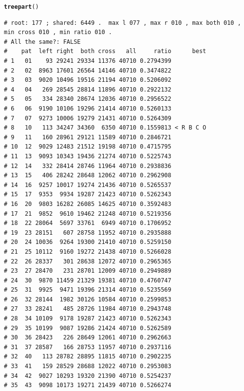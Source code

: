 \documentclass{article}\usepackage[]{graphicx}\usepackage[]{color}
\makeatletter
\newcommand{\hlstd}[1]{\textcolor[rgb]{0.345,0.345,0.345}{#1}}%
\newcommand{\hlkwd}[1]{\textcolor[rgb]{0.737,0.353,0.396}{\textbf{#1}}}%
\newenvironment{kframe}{%
 \def\at@end@of@kframe{}%
 \ifinner\ifhmode%
  \def\at@end@of@kframe{\end{minipage}}%
  \begin{minipage}{\columnwidth}%
 \fi\fi%
 \def\FrameCommand##1{\hskip\@totalleftmargin \hskip-\fboxsep
 \colorbox{shadecolor}{##1}\hskip-\fboxsep
     \hskip-\linewidth \hskip-\@totalleftmargin \hskip\columnwidth}%
 \MakeFramed {\advance\hsize-\width
   \@totalleftmargin\z@ \linewidth\hsize
   \@setminipage}}%
 {\par\unskip\endMakeFramed%
 \at@end@of@kframe}
\newenvironment{knitrout}{}{} %
\makeatother
\begin{document}
\begin{knitrout}\footnotesize
{}\color{fgcolor}\begin{kframe}
\begin{alltt}
\hlkwd{treepart}\hlstd{()}
\end{alltt}
\begin{verbatim}
# root: 177 ; shared: 6449 .  max l 077 , max r 010 , max both 010 , min cross 010 , min ratio 010 . 
# All the same?: FALSE
#    pat  left right  both cross   all     ratio      best
# 1   01    93 29241 29334 11376 40710 0.2794399          
# 2   02  8963 17601 26564 14146 40710 0.3474822          
# 3   03  9020 10496 19516 21194 40710 0.5206092          
# 4   04   269 28545 28814 11896 40710 0.2922132          
# 5   05   334 28340 28674 12036 40710 0.2956522          
# 6   06  9190 10106 19296 21414 40710 0.5260133          
# 7   07  9273 10006 19279 21431 40710 0.5264309          
# 8   10   113 34247 34360  6350 40710 0.1559813 < R B C O
# 9   11   160 28961 29121 11589 40710 0.2846721          
# 10  12  9029 12483 21512 19198 40710 0.4715795          
# 11  13  9093 10343 19436 21274 40710 0.5225743          
# 12  14   332 28414 28746 11964 40710 0.2938836          
# 13  15   406 28242 28648 12062 40710 0.2962908          
# 14  16  9257 10017 19274 21436 40710 0.5265537          
# 15  17  9353  9934 19287 21423 40710 0.5262343          
# 16  20  9803 16282 26085 14625 40710 0.3592483          
# 17  21  9852  9610 19462 21248 40710 0.5219356          
# 18  22 28064  5697 33761  6949 40710 0.1706952          
# 19  23 28151   607 28758 11952 40710 0.2935888          
# 20  24 10036  9264 19300 21410 40710 0.5259150          
# 21  25 10112  9160 19272 21438 40710 0.5266028          
# 22  26 28337   301 28638 12072 40710 0.2965365          
# 23  27 28470   231 28701 12009 40710 0.2949889          
# 24  30  9870 11459 21329 19381 40710 0.4760747          
# 25  31  9925  9471 19396 21314 40710 0.5235569          
# 26  32 28144  1982 30126 10584 40710 0.2599853          
# 27  33 28241   485 28726 11984 40710 0.2943748          
# 28  34 10109  9178 19287 21423 40710 0.5262343          
# 29  35 10199  9087 19286 21424 40710 0.5262589          
# 30  36 28423   226 28649 12061 40710 0.2962663          
# 31  37 28587   166 28753 11957 40710 0.2937116          
# 32  40   113 28782 28895 11815 40710 0.2902235          
# 33  41   159 28529 28688 12022 40710 0.2953083          
# 34  42  9027 10293 19320 21390 40710 0.5254237          
# 35  43  9098 10173 19271 21439 40710 0.5266274          

\end{verbatim}
\end{kframe}
\end{knitrout}
\end{document}
